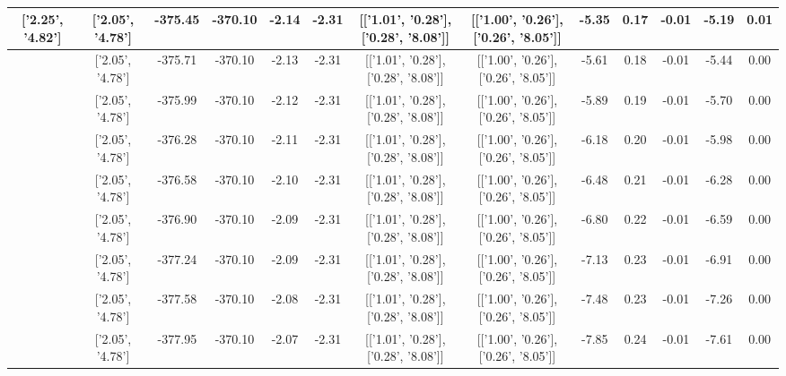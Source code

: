 \begin{table}[htbp]
\begin{adjustbox}{angle=90}
\begin{tabular}{|c|c|c|c|c|c|c|c|c|c|c|c|c|}
 ['2.25', '4.82'] & ['2.05', '4.78'] & -375.45 & -370.10 & -2.14 & -2.31 & [['1.01', '0.28'], ['0.28', '8.08']] & [['1.00', '0.26'], ['0.26', '8.05']] & -5.35 & 0.17 & -0.01 & -5.19 & 0.01\\ \hline
 ['2.26', '4.83'] & ['2.05', '4.78'] & -375.71 & -370.10 & -2.13 & -2.31 & [['1.01', '0.28'], ['0.28', '8.08']] & [['1.00', '0.26'], ['0.26', '8.05']] & -5.61 & 0.18 & -0.01 & -5.44 & 0.00\\ \hline
 ['2.27', '4.83'] & ['2.05', '4.78'] & -375.99 & -370.10 & -2.12 & -2.31 & [['1.01', '0.28'], ['0.28', '8.08']] & [['1.00', '0.26'], ['0.26', '8.05']] & -5.89 & 0.19 & -0.01 & -5.70 & 0.00\\ \hline
 ['2.28', '4.83'] & ['2.05', '4.78'] & -376.28 & -370.10 & -2.11 & -2.31 & [['1.01', '0.28'], ['0.28', '8.08']] & [['1.00', '0.26'], ['0.26', '8.05']] & -6.18 & 0.20 & -0.01 & -5.98 & 0.00\\ \hline
 ['2.29', '4.83'] & ['2.05', '4.78'] & -376.58 & -370.10 & -2.10 & -2.31 & [['1.01', '0.28'], ['0.28', '8.08']] & [['1.00', '0.26'], ['0.26', '8.05']] & -6.48 & 0.21 & -0.01 & -6.28 & 0.00\\ \hline
 ['2.30', '4.84'] & ['2.05', '4.78'] & -376.90 & -370.10 & -2.09 & -2.31 & [['1.01', '0.28'], ['0.28', '8.08']] & [['1.00', '0.26'], ['0.26', '8.05']] & -6.80 & 0.22 & -0.01 & -6.59 & 0.00\\ \hline
 ['2.32', '4.84'] & ['2.05', '4.78'] & -377.24 & -370.10 & -2.09 & -2.31 & [['1.01', '0.28'], ['0.28', '8.08']] & [['1.00', '0.26'], ['0.26', '8.05']] & -7.13 & 0.23 & -0.01 & -6.91 & 0.00\\ \hline
 ['2.33', '4.84'] & ['2.05', '4.78'] & -377.58 & -370.10 & -2.08 & -2.31 & [['1.01', '0.28'], ['0.28', '8.08']] & [['1.00', '0.26'], ['0.26', '8.05']] & -7.48 & 0.23 & -0.01 & -7.26 & 0.00\\ \hline
 ['2.34', '4.84'] & ['2.05', '4.78'] & -377.95 & -370.10 & -2.07 & -2.31 & [['1.01', '0.28'], ['0.28', '8.08']] & [['1.00', '0.26'], ['0.26', '8.05']] & -7.85 & 0.24 & -0.01 & -7.61 & 0.00\\ \hline
            \end{tabular}
        \end{adjustbox}
        \caption{}
        \label{}
    \end{table}
    